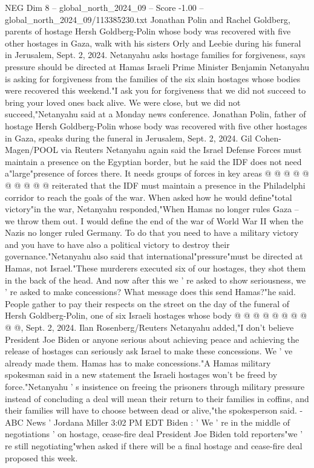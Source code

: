 \begin{textsample}{NEG Dim 8 – global\_north\_2024\_09 – Score -1.00 – global\_north\_2024\_09/113385230.txt}  \label{ex:f8_neg_157}
Jonathan Polin and Rachel Goldberg, parents of hostage Hersh Goldberg-Polin whose body was recovered with five other hostages in Gaza, walk with his sisters Orly and Leebie during his funeral in Jerusalem, Sept. 2, 2024.
Netanyahu asks hostage families for forgiveness, says pressure should be directed at Hamas Israeli Prime Minister Benjamin Netanyahu is asking for forgiveness from the families of the six slain hostages whose bodies were recovered this weekend."I ask you for forgiveness that we did not succeed to bring your loved ones back alive.
We were close, but we did not succeed,"Netanyahu said at a Monday news conference.
Jonathan Polin, father of hostage Hersh Goldberg-Polin whose body was recovered with five other hostages in Gaza, speaks during the funeral in Jerusalem, Sept. 2, 2024.
Gil Cohen-Magen/POOL via Reuters Netanyahu again said the Israel Defense Forces must maintain a presence on the Egyptian border, but he said the IDF does not need a"large"presence of forces there.
It needs groups of forces in key areas @ @ @ @ @ @ @ @ @ @ reiterated that the IDF must maintain a presence in the Philadelphi corridor to reach the goals of the war.
When asked how he would define"total victory"in the war, Netanyahu responded,"When Hamas no longer rules Gaza -- we throw them out.
I would define the end of the war of World War II when the Nazis no longer ruled Germany.
To do that you need to have a military victory and you have to have also a political victory to destroy their governance."Netanyahu also said that international"pressure"must be directed at Hamas, not Israel."These murderers executed six of our hostages, they shot them in the back of the head.
And now after this we ' re asked to show seriousness, we ' re asked to make concessions?
What message does this send Hamas?"he said.
People gather to pay their respects on the street on the day of the funeral of Hersh Goldberg-Polin, one of six Israeli hostages whose body @ @ @ @ @ @ @ @ @ @, Sept. 2, 2024.
Ilan Rosenberg/Reuters Netanyahu added,"I don't believe President Joe Biden or anyone serious about achieving peace and achieving the release of hostages can seriously ask Israel to make these concessions.
We ' ve already made them.
Hamas has to make concessions."A Hamas military spokesman said in a new statement the Israeli hostages won't be freed by force."Netanyahu ' s insistence on freeing the prisoners through military pressure instead of concluding a deal will mean their return to their families in coffins, and their families will have to choose between dead or alive,"the spokesperson said. -ABC News ' Jordana Miller 3:02 PM EDT Biden : ' We ' re in the middle of negotiations ' on hostage, cease-fire deal President Joe Biden told reporters"we ' re still negotiating"when asked if there will be a final hostage and cease-fire deal proposed this week.

\end{textsample}
